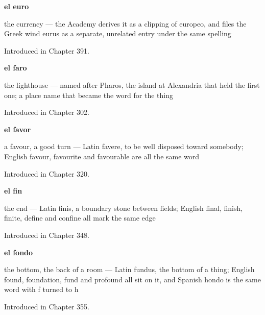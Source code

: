 \noindent\begin{minipage}[t]{\linewidth}
\raggedright
\textbf{el euro}\par
\small the currency — the Academy derives it as a clipping of europeo, and files the Greek wind eurus as a separate, unrelated entry under the same spelling\par
\footnotesize Introduced in Chapter 391.
\end{minipage}\par\medskip

\noindent\begin{minipage}[t]{\linewidth}
\raggedright
\textbf{el faro}\par
\small the lighthouse — named after Pharos, the island at Alexandria that held the first one; a place name that became the word for the thing\par
\footnotesize Introduced in Chapter 302.
\end{minipage}\par\medskip

\noindent\begin{minipage}[t]{\linewidth}
\raggedright
\textbf{el favor}\par
\small a favour, a good turn — Latin favere, to be well disposed toward somebody; English favour, favourite and favourable are all the same word\par
\footnotesize Introduced in Chapter 320.
\end{minipage}\par\medskip

\noindent\begin{minipage}[t]{\linewidth}
\raggedright
\textbf{el fin}\par
\small the end — Latin finis, a boundary stone between fields; English final, finish, finite, define and confine all mark the same edge\par
\footnotesize Introduced in Chapter 348.
\end{minipage}\par\medskip

\noindent\begin{minipage}[t]{\linewidth}
\raggedright
\textbf{el fondo}\par
\small the bottom, the back of a room — Latin fundus, the bottom of a thing; English found, foundation, fund and profound all sit on it, and Spanish hondo is the same word with f turned to h\par
\footnotesize Introduced in Chapter 355.
\end{minipage}\par\medskip

